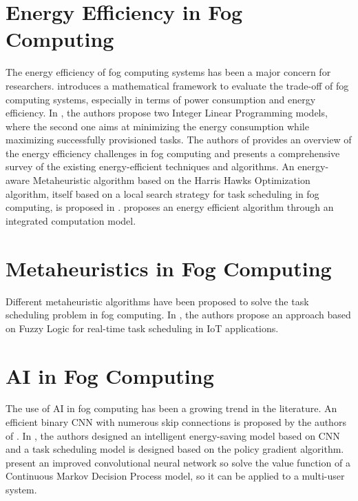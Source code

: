 \section*{Energy Efficiency in Fog Computing}

The energy efficiency of fog computing systems has been a major concern for researchers. \cite{alhumaima-2020}
introduces a mathematical framework to evaluate the trade-off of fog computing systems, especially in terms of power
consumption and energy efficiency. In \cite{he-et-al-2020}, the authors propose two Integer Linear Programming models,
where the second one aims at minimizing the energy consumption while maximizing successfully provisioned tasks. The
authors of \cite{malik-et-al-2022} provides an overview of the energy efficiency challenges in fog computing and
presents a comprehensive survey of the existing energy-efficient techniques and algorithms. An energy-aware
Metaheuristic algorithm based on the Harris Hawks Optimization algorithm, itself based on a local search strategy for
task scheduling in fog computing, is proposed in \cite{abdel-basset-et-al-2021}. \cite{wang-et-al-2023} proposes an
energy efficient algorithm through an integrated computation model.

\section*{Metaheuristics in Fog Computing}

Different metaheuristic algorithms have been proposed to solve the task scheduling problem in fog computing. In
\cite{ali-et-al-2021}, the authors propose an approach based on Fuzzy Logic for real-time task scheduling in IoT
applications.

\section*{AI in Fog Computing}

The use of AI in fog computing has been a growing trend in the literature. An efficient binary CNN with numerous skip
connections is proposed by the authors of \cite{wu-et-al-2021}. In \cite{yang-et-al-2022}, the authors designed an
intelligent energy-saving model based on CNN and a task scheduling model is designed based on the policy gradient
algorithm. \cite{jing-xue-2023} present an improved convolutional neural network so solve the value function of a
Continuous Markov Decision Process model, so it can be applied to a multi-user system.
